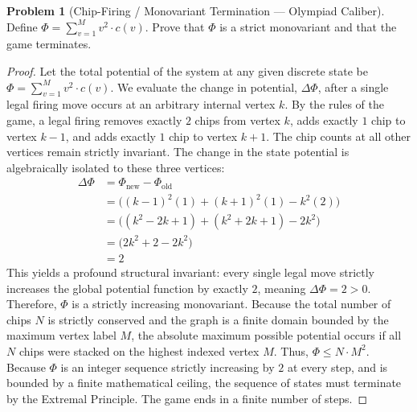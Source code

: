 \documentclass[11pt, a4paper]{article}
\theoremstyle{definition}
\newtheorem{problem}{Problem}
\theoremstyle{plain}
\begin{document}
\vspace{0.5cm}

\begin{problem}[Chip-Firing / Monovariant Termination --- Olympiad Caliber]
Define $\Phi = \sum_{v=1}^M v^2 \cdot c(v)$. Prove that $\Phi$ is a strict monovariant and that the game terminates.
\end{problem}

\begin{proof}
Let the total potential of the system at any given discrete state be $\Phi = \sum_{v=1}^M v^2 \cdot c(v)$.
We evaluate the change in potential, $\Delta \Phi$, after a single legal firing move occurs at an arbitrary internal vertex $k$. 
By the rules of the game, a legal firing removes exactly $2$ chips from vertex $k$, adds exactly $1$ chip to vertex $k - 1$, and adds exactly $1$ chip to vertex $k + 1$. The chip counts at all other vertices remain strictly invariant.
The change in the state potential is algebraically isolated to these three vertices:
\begin{align*}
\Delta \Phi &= \Phi_{\text{new}} - \Phi_{\text{old}} \\
&= \Big( (k - 1)^2 (1) + (k + 1)^2 (1) - k^2 (2) \Big) \\
&= \Big( (k^2 - 2k + 1) + (k^2 + 2k + 1) - 2k^2 \Big) \\
&= \Big( 2k^2 + 2 - 2k^2 \Big) \\
&= 2
\end{align*}
This yields a profound structural invariant: every single legal move strictly increases the global potential function by exactly $2$, meaning $\Delta \Phi = 2 > 0$. Therefore, $\Phi$ is a strictly increasing monovariant.
Because the total number of chips $N$ is strictly conserved and the graph is a finite domain bounded by the maximum vertex label $M$, the absolute maximum possible potential occurs if all $N$ chips were stacked on the highest indexed vertex $M$. Thus, $\Phi \le N \cdot M^2$.
Because $\Phi$ is an integer sequence strictly increasing by $2$ at every step, and is bounded by a finite mathematical ceiling, the sequence of states must terminate by the Extremal Principle. The game ends in a finite number of steps.
\end{proof}
\end{document}
